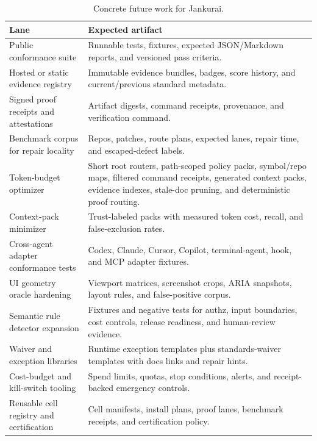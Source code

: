 \begin{table}[t]
\caption{Concrete future work for Jankurai.}
\label{tab:future-work}
\centering
\scriptsize
\begin{tabularx}{\textwidth}{L{0.22\textwidth} Y}
\toprule
\textbf{Lane} & \textbf{Expected artifact} \\
\midrule
Public conformance suite & Runnable tests, fixtures, expected JSON/Markdown reports, and versioned pass criteria. \\
Hosted or static evidence registry & Immutable evidence bundles, badges, score history, and current/previous standard metadata. \\
Signed proof receipts and attestations & Artifact digests, command receipts, provenance, and verification command. \\
Benchmark corpus for repair locality & Repos, patches, route plans, expected lanes, repair time, and escaped-defect labels. \\
Token-budget optimizer & Short root routers, path-scoped policy packs, symbol/repo maps, filtered command receipts, generated context packs, evidence indexes, stale-doc pruning, and deterministic proof routing. \\
Context-pack minimizer & Trust-labeled packs with measured token cost, recall, and false-exclusion rates. \\
Cross-agent adapter conformance tests & Codex, Claude, Cursor, Copilot, terminal-agent, hook, and MCP adapter fixtures. \\
UI geometry oracle hardening & Viewport matrices, screenshot crops, ARIA snapshots, layout rules, and false-positive corpus. \\
Semantic rule detector expansion & Fixtures and negative tests for authz, input boundaries, cost controls, release readiness, and human-review evidence. \\
Waiver and exception libraries & Runtime exception templates plus standards-waiver templates with docs links and repair hints. \\
Cost-budget and kill-switch tooling & Spend limits, quotas, stop conditions, alerts, and receipt-backed emergency controls. \\
Reusable cell registry and certification & Cell manifests, install plans, proof lanes, benchmark receipts, and certification policy. \\
\bottomrule
\end{tabularx}
\end{table}


